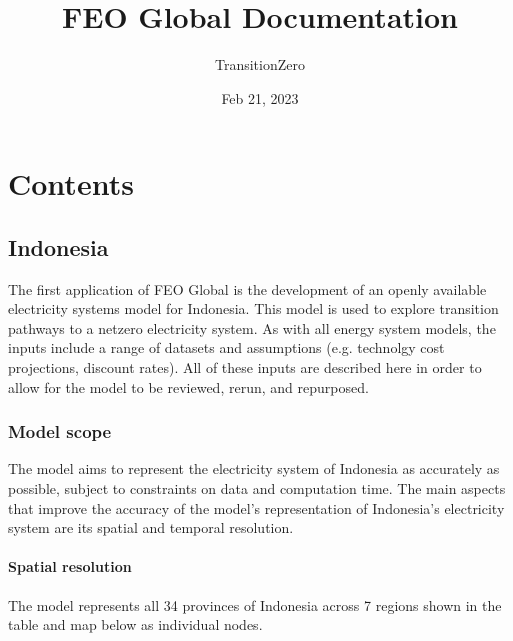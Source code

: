 \documentclass[a4paper,11pt,english]{sphinxmanual}
\title{FEO Global Documentation}
\date{Feb 21, 2023}
\author{TransitionZero}
\begin{document}
\pagestyle{empty}
\sphinxmaketitle
\pagestyle{plain}
\sphinxtableofcontents
\pagestyle{normal}
\label{\detokenize{index::doc}}



\chapter{Contents}
\label{\detokenize{index:contents}}
\sphinxstepscope


\section{Indonesia}
\label{\detokenize{1_indonesia:indonesia}}\label{\detokenize{1_indonesia::doc}}
\sphinxAtStartPar
The first application of FEO Global is the development of an openly available
electricity systems model for Indonesia. This model is used to explore
transition pathways to a net\sphinxhyphen{}zero electricity system. As with all energy system
models, the inputs include a range of datasets and assumptions (e.g. technolgy
cost projections, discount rates). All of these inputs are described here in
order to allow for the model to be reviewed, re\sphinxhyphen{}run, and re\sphinxhyphen{}purposed.


\subsection{Model scope}
\label{\detokenize{1_indonesia:model-scope}}
\sphinxAtStartPar
The model aims to represent the electricity system of Indonesia as accurately as
possible, subject to constraints on data and computation time. The main aspects
that improve the accuracy of the model’s representation of Indonesia’s
electricity system are its spatial and temporal resolution.


\subsubsection{Spatial resolution}
\label{\detokenize{1_indonesia:spatial-resolution}}
\sphinxAtStartPar
The model represents all 34 provinces of Indonesia across 7 regions \sphinxhyphen{} shown in
the table and map below \sphinxhyphen{} as individual nodes.
\end{document}
